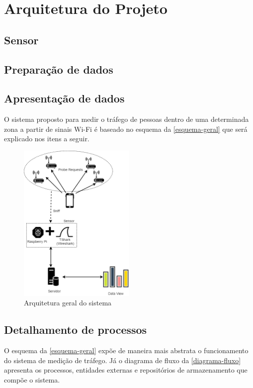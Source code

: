 \chapter{Arquitetura do Projeto}
\label{arquitetura-projeto}

\section{Sensor}

\section{Preparação de dados}

\section{Apresentação de dados}

O sistema proposto para medir o tráfego de pessoas dentro de uma determinada
zona a partir de sinais Wi-Fi é baseado no esquema da \autoref{esquema-geral}
que será explicado nos itens a seguir.

\begin{figure}[!h]
  \caption{\label{esquema-geral}Arquitetura geral do sistema}
  \begin{center}
    \includegraphics[width=0.50\textwidth]{img/esquema_geral.png}
  \end{center}
\end{figure}

\section{Detalhamento de processos}
O esquema da \autoref{esquema-geral} expõe de maneira mais abstrata o
funcionamento do sistema de medição de tráfego. Já o diagrama de fluxo da
\autoref{diagrama-fluxo} apresenta os processos, entidades externas e
repositórios de armazenamento que compõe o sistema.

